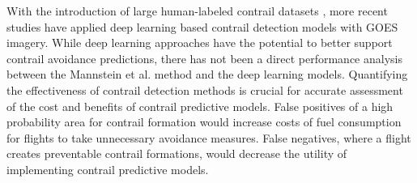 With the introduction of large human-labeled contrail datasets \cite{opencontrails, landsat}, more recent studies have applied deep learning based contrail detection models \cite{opencontrails, covid} with GOES imagery. While deep learning approaches have the potential to better support contrail avoidance predictions, there has not been a direct performance analysis between the Mannstein et al. method and the deep learning models. Quantifying the effectiveness of contrail detection methods is crucial for accurate assessment of the cost and benefits of contrail predictive models. False positives of a high probability area for contrail formation would increase costs of fuel consumption for flights to take unnecessary avoidance measures. False negatives, where a flight creates preventable contrail formations, would decrease the utility of implementing contrail predictive models. 


